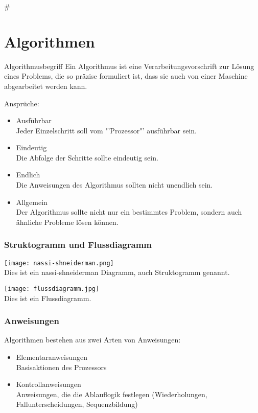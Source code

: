 #\part{Algorithmen}
\begin{zitat}{Algorithmusbegriff}
Ein Algorithmus ist eine Verarbeitungsvorschrift zur Lösung eines Problems, die so präzise formuliert ist, dass sie auch von einer Maschine abgearbeitet werden kann.
\end{zitat}

Ansprüche:
\begin{itemize}
    \item{Ausführbar}\\
    Jeder Einzelschritt soll vom "'Prozessor"' ausführbar sein.
    \item{Eindeutig}\\
    Die Abfolge der Schritte sollte eindeutig sein.
    \item{Endlich}\\
    Die Anweisungen des Algorithmus sollten nicht unendlich sein.
    \item{Allgemein}\\
    Der Algorithmus sollte nicht nur ein bestimmtes Problem, sondern auch ähnliche Probleme lösen können.
\end{itemize}

\section{Struktogramm und Flussdiagramm}
\texttt{[image: nassi-shneiderman.png]}\\
Dies ist ein nassi-shneiderman Diagramm, auch Struktogramm genannt.

\texttt{[image: flussdiagramm.jpg]}\\
Dies ist ein Flussdiagramm.
\newpage
\section{Anweisungen}
Algorithmen bestehen aus zwei Arten von Anweisungen:
\begin{itemize}
    \item{Elementaranweisungen} \\
    Basisaktionen des Prozessors
    \item{Kontrollanweisungen}\\
    Anweisungen, die die Ablauflogik festlegen (Wiederholungen, Fallunterscheidungen, Sequenzbildung)
\end{itemize}

